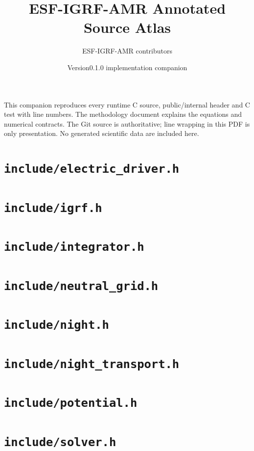 \documentclass[9pt,a4paper]{extarticle}
\title{ESF-IGRF-AMR Annotated Source Atlas}
\author{ESF-IGRF-AMR contributors}
\date{Version0.1.0 implementation companion}
\begin{document}
\maketitle
This companion reproduces every runtime C source, public/internal header and C test with line numbers. The methodology document explains the equations and numerical contracts. The Git source is authoritative; line wrapping in this PDF is only presentation. No generated scientific data are included here.
\tableofcontents
\clearpage
\section{\texttt{include/electric\_driver.h}}

\clearpage
\section{\texttt{include/igrf.h}}

\clearpage
\section{\texttt{include/integrator.h}}

\clearpage
\section{\texttt{include/neutral\_grid.h}}

\clearpage
\section{\texttt{include/night.h}}

\clearpage
\section{\texttt{include/night\_transport.h}}

\clearpage
\section{\texttt{include/potential.h}}

\clearpage
\section{\texttt{include/solver.h}}

\clearpage
\end{document}
